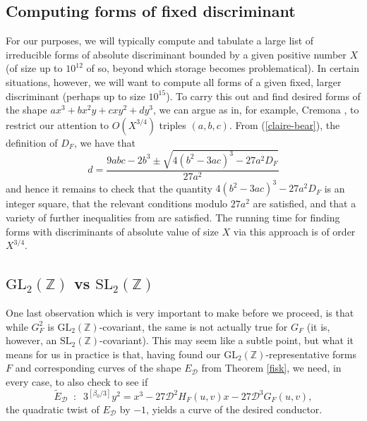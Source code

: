 \documentclass[11pt]{report}
\theoremstyle{definition}
\begin{document}
\subsection{Computing forms of fixed discriminant}
\label{sec:comp-forms-fixed}

For our purposes, we will typically compute and tabulate a large list of irreducible forms of absolute discriminant bounded by a given positive number $X$ (of size up to $10^{12}$ of so, beyond which storage becomes problematical). In certain situations, however, we will want to compute all forms of a given fixed, larger discriminant (perhaps up to size $10^{15}$). To carry this out and find desired forms of the shape $ax^3+bx^2y+cxy^2+dy^3$, we can argue as in, for example, Cremona \cite{Cr}, to restrict our attention to $O(X^{3/4})$ triples $(a,b,c)$.
From (\ref{claire-bear}), the definition of $D_F$, we have that
$$
d = \frac{9abc-2b^3 \pm \sqrt{4 (b^2-3ac)^3-27 a^2 D_F}}{27 a^2}
$$
and hence it remains to check that the quantity $4 (b^2-3ac)^3-27 a^2 D_F$ is an integer square, that the relevant conditions modulo $27a^2$ are satisfied, and that a variety of further inequalities from \cite{Cr} are satisfied. The running time for finding forms with discriminants of absolute value of size $X$ via this approach is of order $X^{3/4}$.



\subsection{$\mbox{GL}_2(\mathbb{Z})$ vs $\mbox{SL}_2(\mathbb{Z})$}
\label{sec:mboxgl_2m-vs-mboxsl}

One last observation which is very important to make before we proceed, is that while $G_F^2$ is $\mbox{GL}_2(\mathbb{Z})$-covariant, the same is not actually true for $G_F$ (it is, however, an $\mbox{SL}_2(\mathbb{Z})$-covariant). This may seem like a subtle point, but what it means for us in practice is that, having found our $\mbox{GL}_2(\mathbb{Z})$-representative forms $F$ and corresponding curves of the shape $E_{\mathcal{D}}$ from Theorem \ref{fisk}, we need, in every case, to also check to see if
$$
\tilde{E}_{\mathcal{D}} \; \; : \; \; 3^{[\beta_0/3]} y^2 = x^3 -27 \mathcal{D} ^2 H_F(u,v) x -27 \mathcal{D} ^3 G_F(u,v),
$$
the quadratic twist of $E_{\mathcal{D}}$ by $-1$, yields a curve of the desired conductor.
\end{document}
